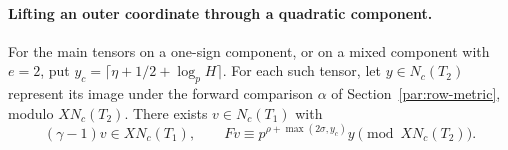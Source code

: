 \paragraph{Lifting an outer coordinate through a quadratic component.}
\label{par:row-mixed}
\hypertarget{source-row-mixed}{}

\begin{lemma}\label{lem:mixed-row-tensors}
For the main tensors on a one-sign component, or on a mixed
component with \(e=2\), put
\(y_c=\lceil\eta+1/2+\log_pH\rceil\).
For each such tensor, let \(y\in N_c(T_2)\) represent its image
under the forward comparison \(\alpha\) of Section~\ref{par:row-metric},
modulo \(XN_c(T_2)\). There exists \(v\in N_c(T_1)\) with
\[
 (\gamma-1)v\in XN_c(T_1),\qquad Fv\equiv p^{\rho+\max(2\sigma,y_c)}y\pmod{XN_c(T_2)}.
\]
\end{lemma}

